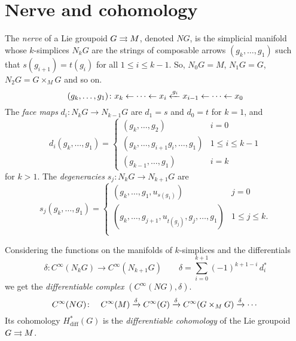 %
%

\section{Nerve and cohomology}\label{sec:nerve-and-cohomology}

The \emph{nerve} of a Lie groupoid $G\rightrightarrows M$, denoted $NG$, is the simplicial manifold whose $k$-simplices $N_kG$ are the strings of composable arrows $(g_k,\dots,g_1)$ such that $s(g_{i+1}) = t(g_i)$ for all $1\leq i\leq k-1$.
So, $N_0G = M$, $N_1G = G$, $N_2G = G\times_M G$ and so on.
\[ (g_k,\dots,g_1) \colon x_k \leftarrow \dots \leftarrow x_i \xleftarrow{g_i} x_{i-1} \leftarrow \dots \leftarrow x_0 \]
The \emph{face maps} $d_i\colon N_kG \to N_{k-1}G$ are $d_1=s$ and $d_0=t$ for $k=1$, and
\begin{equation}
d_i(g_k,\dots,g_1) =
\begin{cases}
  (g_k,\dots,g_2) & i = 0 \\
  (g_k,\dots,g_{i+1}g_i,\dots,g_1) & 1 \leq i \leq k-1 \\
  (g_{k-1},\dots,g_1) & i = k
\end{cases}
\end{equation}
for $k>1$.
The \emph{degeneracies} $s_j\colon N_kG \to N_{k+1}G$ are
\begin{equation}
s_j(g_k,\dots,g_1) =
\begin{cases}
  (g_k,\dots,g_1,u_{s(g_1)}) & j = 0 \\
  (g_k,\dots,g_{j+1},u_{t(g_j)},g_j,\dots,g_1) & 1 \leq j \leq k . \\
\end{cases}
\end{equation}

Considering the functions on the manifolds of $k$-simplices and the differentials
\[ \delta\colon C^\infty(N_kG)\to C^\infty(N_{k+1}G) \qquad \delta = \sum_{i=0}^{k+1} (-1)^{k+1-i} \, d_i^* \]
we get the \emph{differentiable complex} $(C^\infty(NG), \delta)$.
\[ C^\infty(NG)\colon \quad C^\infty(M) \xrightarrow{\delta} C^\infty(G) \xrightarrow{\delta} C^\infty(G\times_M G) \xrightarrow{\delta} \cdots \]
Its cohomology $H_\text{diff}^*(G)$  is the \emph{differentiable cohomology} of the Lie groupoid $G\rightrightarrows M$.

